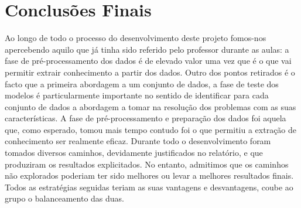 \section{Conclusões Finais}\label{sec:Conclusao}

Ao longo de todo o processo do desenvolvimento deste projeto fomos-nos apercebendo aquilo que já tinha sido referido pelo professor durante as aulas: a fase de pré-processamento dos dados é de elevado valor uma vez que é o que vai permitir extrair conhecimento a partir dos dados. Outro dos pontos retirados é o facto que a primeira abordagem a um conjunto de dados, a fase de teste dos modelos é particularmente importante no sentido de identificar para cada conjunto de dados a abordagem a tomar na resolução dos problemas com as suas características.
A fase de pré-processamento e preparação dos dados foi aquela que, como esperado, tomou mais tempo contudo foi o que permitiu a extração de conhecimento ser realmente eficaz.
Durante todo o desenvolvimento foram tomados diversos caminhos, devidamente justificados no relatório, e que produziram os resultados explicitados. No entanto, admitimos que os caminhos não explorados poderiam ter sido melhores ou levar a melhores resultados finais. Todos as estratégias seguidas teriam as suas vantagens e desvantagens, coube ao grupo o balanceamento das duas.